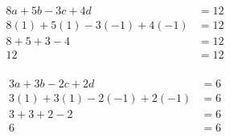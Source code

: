 \documentclass[fleqn]{article}
\begin{document}
    \begin{align*}
      8a+5b-3c+4d&=12 \\
      8(1)+5(1)-3(-1)+4(-1) &= 12 \\
      8 + 5 +3 -4 &= 12 \\
      12 &= 12 \\
    \end{align*}

    \begin{align*}
      3a+3b-2c+2d&= 6 \\
      3(1) + 3(1) - 2(-1) + 2(-1) &= 6 \\
      3 + 3 + 2 -2 &= 6 \\
      6 &= 6 \\
    \end{align*}
\end{document}
